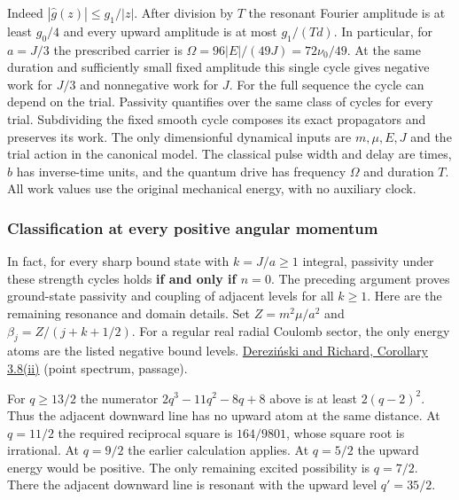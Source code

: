 \documentclass[11pt,a4paper]{article}
\begin{document}
Indeed \(|\widehat g(z)|\le g_1/|z|\). After division by \(T\) the
resonant Fourier amplitude is at least \(g_0/4\) and every upward
amplitude is at most \(g_1/(Td)\). In particular, for \(a=J/3\) the
prescribed carrier is \(\Omega=96|E|/(49J)=72\nu_0/49\). At the same
duration and sufficiently small fixed amplitude this single cycle gives
negative work for \(J/3\) and nonnegative work for \(J\). For the full
sequence the cycle can depend on the trial. Passivity quantifies over
the same class of cycles for every trial. Subdividing the fixed smooth
cycle composes its exact propagators and preserves its work. The only
dimensionful dynamical inputs are \(m,\mu,E,J\) and the trial action in
the canonical model. The classical pulse width and delay are times,
\(b\) has inverse-time units, and the quantum drive has frequency
\(\Omega\) and duration \(T\). All work values use the original
mechanical energy, with no auxiliary clock.

\subsubsection{Classification at every positive angular
momentum}\label{classification-at-every-positive-angular-momentum}

In fact, for every sharp bound state with \(k=J/a\ge1\) integral,
passivity under these strength cycles holds \textbf{if and only if
\(n=0\)}. The preceding argument proves ground-state passivity and
coupling of adjacent levels for all \(k\ge1\). Here are the remaining
resonance and domain details. Set \(Z=m^2\mu/a^2\) and
\(\beta_j=Z/(j+k+1/2)\). For a regular real radial Coulomb sector, the
only energy atoms are the listed negative bound levels.
\href{https://arxiv.org/pdf/1712.04068}{Dereziński and Richard,
Corollary 3.8(ii)} (point spectrum, passage).

For \(q\ge13/2\) the numerator \(2q^3-11q^2-8q+8\) above is at least
\(2(q-2)^2\). Thus the adjacent downward line has no upward atom at the
same distance. At \(q=11/2\) the required reciprocal square is
\(164/9801\), whose square root is irrational. At \(q=9/2\) the earlier
calculation applies. At \(q=5/2\) the upward energy would be positive.
The only remaining excited possibility is \(q=7/2\). There the adjacent
downward line is resonant with the upward level \(q'=35/2\).
\end{document}
